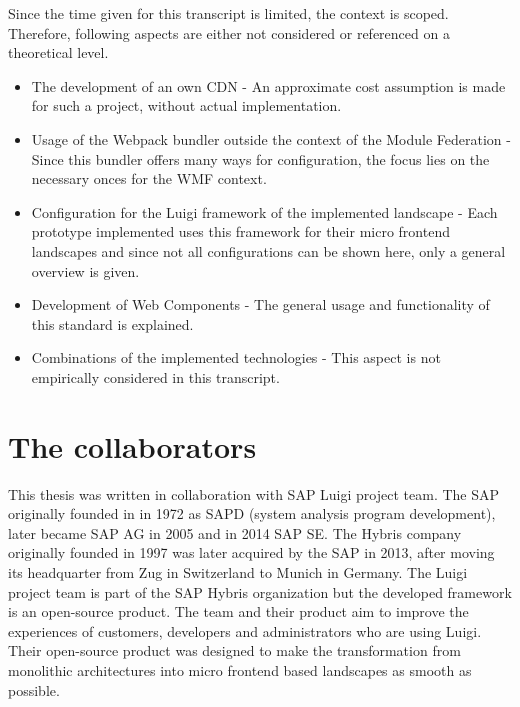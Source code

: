 Since the time given for this transcript is limited, the context is scoped. Therefore, following aspects are either not considered or referenced on a theoretical level.

\begin{itemize}
	\item The development of an own CDN - An approximate cost assumption is made for such a project, without actual implementation.
	\item Usage of the Webpack bundler outside the context of the Module Federation - Since this bundler offers many ways for configuration, the focus lies on the necessary onces for the WMF context.
	\item Configuration for the Luigi framework of the implemented landscape - Each prototype implemented uses this framework for their micro frontend landscapes and since not all configurations can be shown here, only a general overview is given.
	\item Development of Web Components - The general usage and functionality of this standard is explained.
	\item Combinations of the implemented technologies - This aspect is not empirically considered in this transcript.
\end{itemize}

\section{The collaborators}

This thesis was written in collaboration with SAP Luigi project team. The SAP originally founded in in 1972 as SAPD (system analysis program development), later became SAP AG in 2005 and in 2014 SAP SE. The Hybris company originally founded in 1997 was later acquired by the SAP in 2013, after moving its headquarter from Zug in Switzerland to Munich in Germany. The Luigi project team is part of the SAP Hybris organization but the developed framework is an open-source product. 
The team and their product aim to improve the experiences of customers, developers and administrators who are using Luigi. Their open-source product was designed to make the transformation from monolithic architectures into micro frontend based landscapes as smooth as possible. 

 
